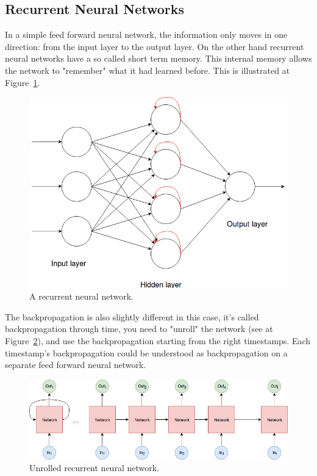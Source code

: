 \subsection{Recurrent Neural Networks}

In a simple feed forward neural network, the information only moves in one direction: from the input layer to the output layer. On the other hand recurrent neural networks have a so called short term memory. This internal memory allows the network to "remember" what it had learned before. This is illustrated at Figure~\ref{fig:recurrent_net}.
\begin{figure}[!htb]
	\centering
	\includegraphics[scale=0.5]{recurrent_neural_network.jpg}
	\caption{A recurrent neural network.}
	\label{fig:recurrent_net}
\end{figure}

The backpropagation is also slightly different in this case, it's called backpropagation through time, you need to "unroll" the network (see at Figure~\ref{fig:unrolled}), and use the backpropagation starting from the right timestamps. Each timestamp's backpropagation could be understood as backpropagation on a separate feed forward neural network. 
\begin{figure}[!htb]
	\centering
	\includegraphics[scale=0.5]{unrolled.jpg}
	\caption{Unrolled recurrent neural network.}
	\label{fig:unrolled}
\end{figure}

